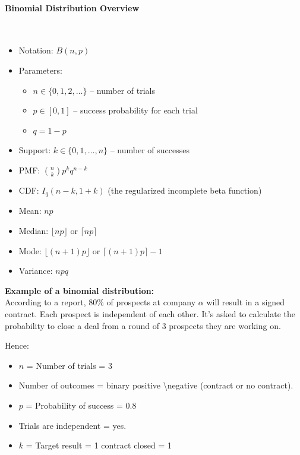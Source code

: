 \documentclass{article}
\begin{document}
\paragraph{Binomial Distribution Overview}\mbox{} \\

\begin{itemize}
    \item Notation: $B(n,p)$
    \item Parameters: 
        \begin{itemize}
            \item $ \displaystyle n\in \{0,1,2,\ldots \} $ – number of trials 
            \item $ \displaystyle p\in [0,1] $ – success probability for each trial
            \item $ {\displaystyle q=1-p} $
        \end{itemize}
    \item Support: $ \displaystyle k\in \{0,1,\ldots ,n\}$ – number of successes 
    \item PMF: $ \displaystyle {\binom {n}{k}}p^{k}q^{n-k} $
    \item CDF: $ \displaystyle I_{q}(n-k,1+k) $ (the regularized incomplete beta function)
    \item Mean: $np$
    \item Median: $\lfloor np \rfloor$  or $\lceil np \rceil $
    \item Mode: $\lfloor (n+1)p \rfloor$  or $\lceil (n+1)p \rceil-1 $
    \item Variance: $npq$ 
\end{itemize}

\textbf{Example of a binomial distribution:} \\

According to a report, 80\% of prospects at company $\alpha$ will result in a signed contract. Each prospect is independent of each other.
It's asked to calculate the probability to close a deal from a round of 3 prospects they are working on.

Hence:
\begin{itemize}
    \item $n$ = Number of trials = 3
    \item Number of outcomes = binary positive \textbackslash negative (contract or no contract).
    \item $p$ = Probability of success = 0.8
    \item Trials are independent = yes.
    \item $k$ = Target result = 1 contract closed = 1
\end{itemize}
\end{document}
